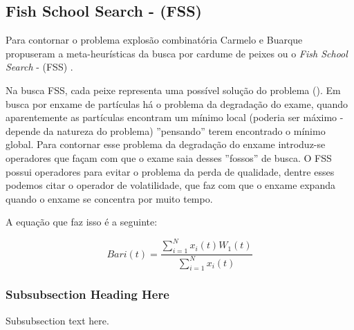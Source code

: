\documentclass[conference,compsoc]{IEEEtran}
\begin{document}
\subsection{Fish School Search - (FSS) }\label{arte:algo:fss}

Para contornar o problema explosão combinatória Carmelo e Buarque propuseram a meta-heurísticas da busca por cardume de peixes
ou o \textit{Fish School Search} - (FSS) \cite{Filho2008}.

Na busca FSS, cada peixe representa uma possível solução do problema (\cite{Filho2008}).
Em busca por enxame de partículas há o problema da degradação do exame, quando aparentemente as partículas encontram
um mínimo local (poderia ser máximo - depende da natureza do problema) ''pensando'' terem encontrado o mínimo global.
Para contornar esse problema da degradação do enxame introduz-se operadores que façam com que o exame saia desses ''fossos''
de busca.
O FSS possui operadores para evitar o problema da perda de qualidade, dentre esses podemos citar o operador de volatilidade, 
que faz com que o enxame expanda quando o enxame se concentra por muito tempo.

A equação que faz isso é a seguinte:

\begin{equation}
Bari(t) = \frac{\sum_{i=1}^{N}x_i(t)W_1(t)}{\sum_{i=1}^{N}x_i(t)}
\end{equation}


\subsubsection{Subsubsection Heading Here}
Subsubsection text here.


%
%
\end{document}
